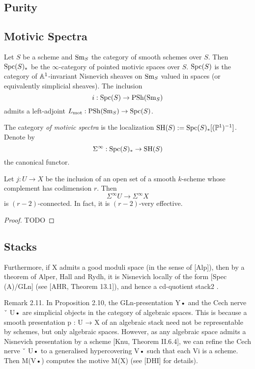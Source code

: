 \documentclass[12pt]{article}
\begin{document}
\subsection{Purity}



\subsection{Motivic Spectra}

\newcommand{\SH}{\mathrm{SH}}

Let $S$ be a scheme and $\mathrm{Sm}_S$ the category of smooth schemes over $S$. Then $\mathrm{Spc}(S)_*$ be the $\infty$-category of pointed motivic spaces over $S$. $\mathrm{Spc}(S)$ is the category of $\mathbb{A}^1$-invariant Nisnevich sheaves on $\mathrm{Sm}_S$ valued in spaces (or equivalently simplicial sheaves). The inclusion
\[ i : \mathrm{Spc}(S) \to \mathrm{PSh}(\mathrm{Sm}_S) \]
admits a left-adjoint $L_{\text{mot}} : \mathrm{PSh}(\mathrm{Sm}_S) \to \mathrm{Spc}(S)$. 

\begin{defn}
The category \textit{of motivic spectra} is the localization $\SH(S) := \Spc(S)_*[(\P^1)^{-1}]$. Denote by
\[ \Sigma^\infty : \Spc(S)_* \to \SH(S) \]
the canonical functor. 
\end{defn}

\begin{prop}
Let $j : U \to X$ be the inclusion of an open set of a smooth $k$-scheme whose complement has codimension $r$. Then
\[ \Sigma^\infty U \to \Sigma^\infty X \]
is $(r-2)$-connected. In fact, it is $(r-2)$-very effective. 
\end{prop}

\begin{proof}
{\color{red} TODO}
\end{proof}

\subsection{Stacks}

Furthermore, if X admits a good moduli space (in the sense of [Alp]), then by a theorem of Alper,
Hall and Rydh, it is Nisnevich locally of the form [Spec (A)/GLn] (see [AHR, Theorem 13.1]), and
hence a cd-quotient stack2
.

Remark 2.11. In Proposition 2.10, the GLn-presentation Y• and the Cech nerve ˇ U• are simplicial
objects in the category of algebraic spaces. This is because a smooth presentation p : U → X of an
algebraic stack need not be representable by schemes, but only algebraic spaces. However, as any
algebraic space admits a Nisnevich presentation by a scheme [Knu, Theorem II.6.4], we can refine the
Cech nerve ˇ U• to a generalised hypercovering V• such that each Vi
is a scheme. Then M(V•) computes
the motive M(X) (see [DHI] for details).
\end{document}
